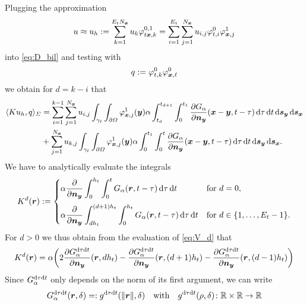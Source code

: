 \documentclass[a4paper,11pt]{article}
\begin{document}
Plugging the approximation
\begin{equation*}
 u \approx u_h := \sum_{k=1}^{E_t N_{{\bm{x}}}} u_k \varphi^{0,1}_{t{{\bm{x}}},k} = \sum_{i=1}^{E_t} \sum_{j=1}^{N_{{\bm{x}}}} u_{i,j} \varphi^0_{t,i} \varphi^1_{{{\bm{x}}},j}
\end{equation*}
into \eqref{eq:D_bil} and testing with
\begin{equation*}
  q := \varphi^0_{t,k} \varphi^0_{{{\bm{x}}},\ell}
\end{equation*}
we obtain for $d=k-i$ that
\begin{align*}
  \langle Ku_h, q \rangle_\Sigma &= \sum_{i=1}^{k-1} \sum_{j=1}^{N_{{\bm{x}}}} u_{i,j} \int_{\gamma_\ell} \int_{\partial\Omega} \varphi^1_{{{\bm{x}}},j}({{\bm{y}}}) \alpha \int_{t_d}^{t_{d+1}} \int_{0}^{t_1} \frac{\partial G_\alpha}{\partial {\ensuremath{{\bm{n}}}}_{{\bm{y}}}}({{\bm{x}}}-{{\bm{y}}},t-\tau) \,{\mathrm{d}}\tau \,{\mathrm{d}} t \,{\mathrm{d}}{{\bm{s}}}_{{\bm{y}}} \,{\mathrm{d}}{{\bm{s}}}_{{\bm{x}}} \\
  &+ \sum_{j=1}^{N_{{\bm{x}}}} u_{k,j} \int_{\gamma_\ell} \int_{\partial\Omega} \varphi^1_{{{\bm{x}}},j}({{\bm{y}}}) \alpha \int_{0}^{t_1} \int_{0}^{t} \frac{\partial G_\alpha}{\partial {\ensuremath{{\bm{n}}}}_{{\bm{y}}}}({{\bm{x}}}-{{\bm{y}}},t-\tau) \,{\mathrm{d}}\tau \,{\mathrm{d}} t \,{\mathrm{d}}{{\bm{s}}}_{{\bm{y}}} \,{\mathrm{d}}{{\bm{s}}}_{{\bm{x}}}.
\end{align*}
We have to analytically evaluate the integrals
\begin{equation*}
  K^d({{\bm{r}}}) := 
  \begin{cases}
  \displaystyle
    \alpha \frac{\partial}{\partial {\ensuremath{{\bm{n}}}}_{{\bm{y}}}} \int_{0}^{h_t} \int_{0}^{t} G_\alpha({{\bm{r}}},t-\tau) \,{\mathrm{d}}\tau \,{\mathrm{d}} t & \text{for } d = 0, \\[4mm]
  \displaystyle
    \alpha \frac{\partial}{\partial {\ensuremath{{\bm{n}}}}_{{\bm{y}}}} \int_{dh_t}^{(d+1)h_t} \int_{0}^{h_t} G_\alpha({{\bm{r}}},t-\tau) \,{\mathrm{d}}\tau \,{\mathrm{d}} t & \text{for } d \in \{1,\ldots,E_t-1\}.
  \end{cases}
\end{equation*}
For $d > 0$ we thus obtain from the evaluation of \eqref{eq:V_d} that
\begin{align*}
  K^d({{\bm{r}}}) = \alpha \bigg( 2 \frac{\partial G^{{\mathrm{d}}\tau{\mathrm{d}} t}_\alpha}{\partial {\ensuremath{{\bm{n}}}}_{{\bm{y}}}} ({{\bm{r}}},dh_t) - \frac{\partial G^{{\mathrm{d}}\tau{\mathrm{d}} t}_\alpha}{\partial {\ensuremath{{\bm{n}}}}_{{\bm{y}}}}({{\bm{r}}},(d+1)h_t) - \frac{\partial G^{{\mathrm{d}}\tau{\mathrm{d}} t}_\alpha}{\partial {\ensuremath{{\bm{n}}}}_{{\bm{y}}}}({{\bm{r}}},(d-1)h_t) \bigg)
\end{align*}
Since $G^{{\mathrm{d}}\tau{\mathrm{d}} t}_\alpha$ only depends on the norm of its first argument, we can write 
\begin{equation}
  \label{eq:G_to_g}
  G^{{\mathrm{d}}\tau{\mathrm{d}} t}_\alpha({{\bm{r}}},\delta) =: g^{{\mathrm{d}}\tau{\mathrm{d}} t}(\|{{\bm{r}}}\|,\delta) \quad\text{with}\quad g^{{\mathrm{d}}\tau{\mathrm{d}} t}(\rho,\delta)\colon {\mathbb{R}}\times{\mathbb{R}}\to{\mathbb{R}}
\end{equation}
\end{document}
